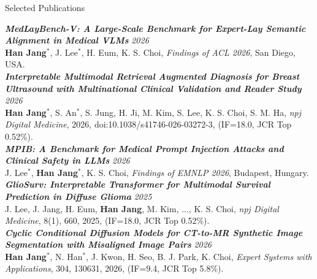\documentclass{resume}
\begin{document}
\begin{rSection}{Selected Publications}

\textbf{\textit{MedLayBench-V: A Large-Scale Benchmark for Expert-Lay Semantic Alignment in Medical VLMs}}%
\hfill \textit{2026} \\
\hspace*{1em} \textbf{Han Jang}$^{*}$, J. Lee$^{*}$, H. Eum, K. S. Choi, \textit{Findings of ACL 2026}, San Diego, USA.
\\[0.6em]

\textbf{\textit{Interpretable Multimodal Retrieval Augmented Diagnosis for Breast Ultrasound with Multinational Clinical Validation and Reader Study}}%
\hfill \textit{2026} \\
\hspace*{1em} \textbf{Han Jang}$^{*}$, S. An$^{*}$, S. Jung, H. Ji, M. Kim, S. Lee, K. S. Choi, S. M. Ha, \textit{npj Digital Medicine}, 2026, doi:10.1038/s41746-026-03272-3, (IF=18.0, JCR Top 0.52\%).
\\[0.6em]

\textbf{\textit{MPIB: A Benchmark for Medical Prompt Injection Attacks and Clinical Safety in LLMs}}%
\hfill \textit{2026} \\
\hspace*{1em} J. Lee$^{*}$, \textbf{Han Jang}$^{*}$, K. S. Choi, \textit{Findings of EMNLP 2026}, Budapest, Hungary.
\\[0.6em]

\textbf{\textit{GlioSurv: Interpretable Transformer for Multimodal Survival Prediction in Diffuse Glioma}}%
\hfill \textit{2025} \\
\hspace*{1em} J. Lee, J. Jang, H. Eum, \textbf{Han Jang}, M. Kim, ..., K. S. Choi, \textit{npj Digital Medicine}, 8(1), 660, 2025, (IF=18.0, JCR Top 0.52\%).
\\[0.6em]

\textbf{\textit{Cyclic Conditional Diffusion Models for CT-to-MR Synthetic Image Segmentation with Misaligned Image Pairs}}%
\hfill \textit{2026} \\
\hspace*{1em} \textbf{Han Jang}$^{*}$, N. Han$^{*}$, J. Kwon, H. Seo, B. J. Park, K. Choi, \textit{Expert Systems with Applications}, 304, 130631, 2026, (IF=9.4, JCR Top 5.8\%).

\end{rSection}
\end{document}
